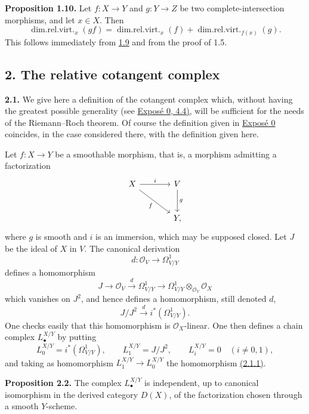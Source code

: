 \textbf{Proposition 1.10.} Let $f:X\to Y$ and $g:Y\to Z$ be two complete-intersection morphisms, and let $x\in X$. Then
\[
\operatorname{dim.rel.virt.}_x(gf)=
\operatorname{dim.rel.virt.}_x(f)+
\operatorname{dim.rel.virt.}_{f(x)}(g).
\]
This follows immediately from \hyperlink{sga6.e08.def.1-9}{1.9} and from the proof of 1.5.

\subsection*{2. The relative cotangent complex}

\textbf{2.1.} We give here a definition of the cotangent complex which, without having the greatest possible generality (see \hyperlink{sga6.e00.sec.4.4}{Expos\'e 0, 4.4)}, will be sufficient for the needs of the Riemann--Roch theorem. Of course the definition given in \hyperlink{sga6.e00.expose}{Expos\'e 0} coincides, in the case considered there, with the definition given here.

Let $f:X\to Y$ be a smoothable morphism, that is, a morphism admitting a factorization
\[
\begin{tikzcd}[column sep=large,row sep=large]
X \arrow[r,"i"] \arrow[dr,"f"'] & V \arrow[d,"g"]\\
& Y,
\end{tikzcd}
\]
where $g$ is smooth and $i$ is an immersion, which may be supposed closed. Let $J$ be the ideal of $X$ in $V$. The canonical derivation
\[
d:\mathcal O_V\longrightarrow\Omega^1_{V/Y}
\]
defines a homomorphism
\[
J\longrightarrow\mathcal O_V\xrightarrow{d}\Omega^1_{V/Y}\longrightarrow
\Omega^1_{V/Y}\otimes_{\mathcal O_V}\mathcal O_X
\]
which vanishes on $J^2$, and hence defines a homomorphism, still denoted $d$,
\begin{equation}\tag{2.1.1}
J/J^2\xrightarrow{d} i^*(\Omega^1_{V/Y}).
\end{equation}
One checks easily that this homomorphism is $\mathcal O_X$-linear. One then defines a chain complex $L^{X/Y}_\bullet$ by putting
\[
L^{X/Y}_0=i^*(\Omega^1_{V/Y}),\qquad
L^{X/Y}_1=J/J^2,
\qquad
L^{X/Y}_i=0\quad(i\neq 0,1),
\]
and taking as homomorphism $L^{X/Y}_1\to L^{X/Y}_0$ the homomorphism \hyperlink{sga6.e08.eq.2-1-1}{(2.1.1)}.

\textbf{Proposition 2.2.} The complex $L^{X/Y}_\bullet$ is independent, up to canonical isomorphism in the derived category $D(X)$, of the factorization chosen through a smooth $Y$-scheme.

